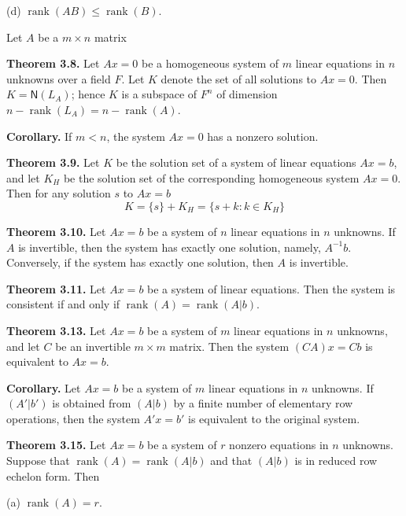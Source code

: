 \documentclass{article}
\newcommand{\0}{\mathit{0}}
\begin{document}
(d) $\operatorname{rank}(AB) \leq \operatorname{rank}(B)$.

\medskip

Let $A$ be a $m\times n$ matrix

\textbf{Theorem 3.8.} Let $Ax = 0$ be a homogeneous system of $m$ linear
equations in $n$ unknowns over a field $F$. Let $K$ denote the set of all
solutions to $Ax = 0$. Then $K = \mathsf{N}(L_A)$; hence $K$ is a subspace
of $F^n$ of dimension
$n - \operatorname{rank}(L_A) = n - \operatorname{rank}(A)$.

\medskip

\textbf{Corollary.} If $m < n$, the system $Ax = 0$ has a nonzero solution.

\medskip

\textbf{Theorem 3.9.} Let $K$ be the solution set of a system of linear equations
$Ax = b$, and let $K_H$ be the solution set of the corresponding homogeneous
system $Ax = 0$. Then for any solution $s$ to $Ax = b$
\[K = \{s\} + K_H = \{s + k : k \in K_H\}\]

\medskip

\textbf{Theorem 3.10.} Let $Ax = b$ be a system of $n$ linear equations in
$n$ unknowns. If $A$ is invertible, then the system has exactly one solution,
namely, $A^{-1}b$. Conversely, if the system has exactly one solution, then
$A$ is invertible.

\medskip

\textbf{Theorem 3.11.} Let $Ax = b$ be a system of linear equations. Then the
system is consistent if and only if $\operatorname{rank}(A) = \operatorname{rank}(A|b)$.

\medskip

\textbf{Theorem 3.13.} Let $Ax = b$ be a system of $m$ linear equations in $n$
unknowns, and let $C$ be an invertible $m \times m$ matrix.
Then the system
$(CA)x = Cb$ is equivalent to $Ax = b$.

\medskip

\textbf{Corollary.} Let $Ax = b$ be a system of $m$ linear equations in $n$
unknowns. If $(A'|b')$ is obtained from $(A|b)$ by a finite number of
elementary row operations, then the system $A'x = b'$ is equivalent to the
original system.

\medskip

\textbf{Theorem 3.15.} Let $Ax = b$ be a system of $r$ nonzero equations in $n$
unknowns. Suppose that $\operatorname{rank}(A) = \operatorname{rank}(A|b)$ and that
$(A|b)$ is in reduced row echelon form. Then

(a) $\operatorname{rank}(A) = r$.
\end{document}
